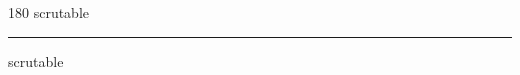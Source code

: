 
\begin{frame}
\begin{center}
\begin{turn}{180}
{\fontsize{2.5cm}{1em}\selectfont scrutable}
\end{turn}
\vspace{1em}\par  
\hrule
\vspace{1em}\par  
{\fontsize{2.5cm}{1em}\selectfont scrutable}
\end{center}
\end{frame}
